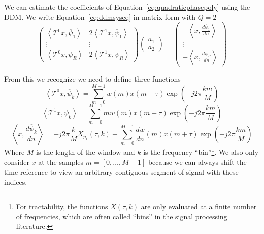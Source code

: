 We can estimate the coefficients of Equation~\ref{eq:quadraticphasepoly} using
the DDM. We write Equation~\ref{eq:ddmsyseq} in matrix form with $Q=2$
\[
    \begin{pmatrix}
        \left\langle \mathcal{T}^{0} x , \overline{\psi}_{1} \right\rangle &
        2\left\langle \mathcal{T}^{1} x , \overline{\psi}_{1} \right\rangle \\
        \vdots & \vdots \\
        \left\langle \mathcal{T}^{0} x , \overline{\psi}_{R} \right\rangle & 
        2\left\langle \mathcal{T}^{1} x , \overline{\psi}_{R} \right\rangle
    \end{pmatrix}
    \begin{pmatrix}
        a_{1} \\
        a_{2}
    \end{pmatrix}
    =
    \begin{pmatrix}
        -\left\langle  x , \frac{d\overline{\psi}_{1}}{dn} \right\rangle \\
        \vdots \\
        -\left\langle  x , \frac{d\overline{\psi}_{R}}{dn} \right\rangle
    \end{pmatrix}
\]

From this we recognize we need to define three functions
\[
    \left\langle \mathcal{T}^{0} x , \overline{\psi}_{k} \right\rangle 
    =
    \sum_{m=0}^{M-1} w(m) x(m + \tau) \exp(-j 2 \pi \frac{k m}{M})
\]
\[
    \left\langle \mathcal{T}^{1} x , \overline{\psi}_{k} \right\rangle
    =
    \sum_{m=0}^{M-1} m w(m) x(m + \tau) \exp(-j 2 \pi \frac{k m}{M})
\]
\[
    \left\langle  x , \frac{d\overline{\psi}_{k}}{dn} \right\rangle
    =
    -j 2 \pi \frac{k}{M} X_{p_{1}} \left( \tau , k \right) + 
    \sum_{m=0}^{M-1} \frac{dw}{dn}(m) x(m + \tau) \exp(-j 2 \pi \frac{k m}{M})
\]
Where $M$ is the length of the window and $k$ is the frequency
``bin''\footnote{For tractability, the functions $X(\tau,k)$ are only evaluated at
    a finite number of frequencies, which are often called ``bins'' in the
signal processing literature.}. We also
only consider $x$ at the samples $m = [0, \dotsc, M-1]$ because we can always
shift the time reference to view an arbitrary contiguous segment of signal with
these indices.

